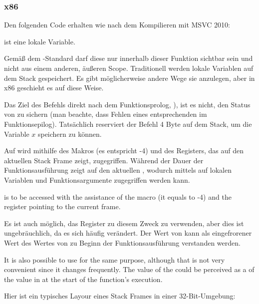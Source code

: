 \subsubsection{x86}

Den folgenden Code erhalten wie nach dem Kompilieren mit MSVC 2010:



 ist eine lokale Variable.

Gemäß dem \CCpp-Standard darf diese nur innerhalb dieser Funktion sichtbar sein und nicht aus einem anderen, äußeren Scope.
Traditionell werden lokale Variablen auf dem Stack gespeichert.
Es gibt möglicherweise andere Wege sie anzulegen, aber in x86 geschieht es auf diese Weise.


Das Ziel des Befehls direkt nach dem Funktionsprolog, ), ist es nicht, den Status von \ECX zu sichern
(man beachte, dass Fehlen eines entsprechenden  im Funktionsepilog).
Tatsächlich reserviert der Befehl 4 Byte auf dem Stack, um die Variable $x$ speichern zu können.

\label{stack_frame}
Auf  wird mithilfe des  Makros (es entspricht -4) und des \EBP Registers, das auf den aktuellen Stack Frame zeigt, zugegriffen. 
Während der Dauer der Funktionsausführung zeigt \EBP auf den aktuellen , wodurch mittels  auf lokalen Variablen und Funktionsargumente zugegriffen werden kann.

 is to be accessed with the assistance of the  macro (it equals to -4) and the \EBP register pointing to the current frame.

Es ist auch möglich, das \ESP Register zu diesem Zweck zu verwenden, aber dies ist ungebräuchlich, da es sich häufig verändert.
Der Wert von \EBP kann als eingefrorener Wert des Wertes von \ESP zu Beginn der Funktionsausführung verstanden werden.

It is also possible to use \ESP for the same purpose, although that is not very convenient since it changes frequently.
The value of the \EBP could be perceived as a  of the value in \ESP at the start of the function's execution.

Hier ist ein typisches Layour eines Stack Frames in einer 32-Bit-Umgebung:

